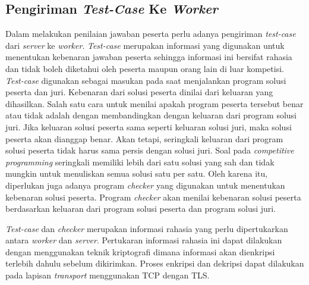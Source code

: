 \subsection{Pengiriman \textit{Test-Case} Ke \textit{Worker}} \label{subsec:sending-test-case-to-worker}

\par Dalam melakukan penilaian jawaban peserta perlu adanya pengiriman \textit{test-case} dari \textit{server} ke \textit{worker}. \textit{Test-case} merupakan informasi yang digunakan untuk menentukan kebenaran jawaban peserta sehingga informasi ini bersifat rahasia dan tidak boleh diketahui oleh peserta maupun orang lain di luar kompetisi. \textit{Test-case} digunakan sebagai masukan pada saat menjalankan program solusi peserta dan juri. Kebenaran dari solusi peserta dinilai dari keluaran yang dihasilkan. Salah satu cara untuk menilai apakah program peserta tersebut benar atau tidak adalah dengan membandingkan dengan keluaran dari program solusi juri. Jika keluaran solusi peserta sama seperti keluaran solusi juri, maka solusi peserta akan dianggap benar. Akan tetapi, seringkali keluaran dari program solusi peserta tidak harus sama persis dengan solusi juri. Soal pada \textit{competitive programming} seringkali memiliki lebih dari satu solusi yang sah dan tidak mungkin untuk menuliskan semua solusi satu per satu. Oleh karena itu, diperlukan juga adanya program \textit{checker} yang digunakan untuk menentukan kebenaran solusi peserta. Program \textit{checker} akan menilai kebenaran solusi peserta berdasarkan keluaran dari program solusi peserta dan program solusi juri.

\par \textit{Test-case} dan \textit{checker} merupakan informasi rahasia yang perlu dipertukarkan antara \textit{worker} dan \textit{server}. Pertukaran informasi rahasia ini dapat dilakukan dengan menggunakan teknik kriptografi dimana informasi akan dienkripsi terlebih dahulu sebelum dikirimkan. Proses enkripsi dan dekripsi dapat dilakukan pada lapisan \textit{transport} menggunakan TCP dengan TLS.

